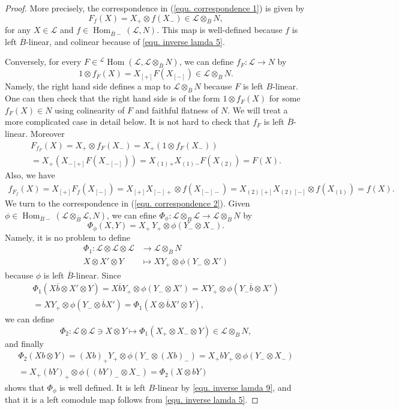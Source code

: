 \documentclass[a4paper,reqno]{amsart}
\DeclareMathOperator{\Hom}{Hom}
\numberwithin{equation}{section}
\theoremstyle{plain}
\theoremstyle{remark}
\numberwithin{equation}{section}
\newcommand{\ot}{\otimes}
\newcommand\ol{\overline}
\newcommand{\cL}{\mathcal{L}}
\newcommand{\BB}{\overline{B}}
\renewcommand{\o}{{}_{\scriptscriptstyle{(1)}}}
\renewcommand{\t}{{}_{\scriptscriptstyle{(2)}}}
\newcommand\ou[1]{\otimes_{#1}}
\newcommand{\CL}{\mathcal{L}}
\begin{document}
\begin{proof}
    More precisely, the correspondence in (\ref{equ. correspondence 1}) is given by
\[F_{f}(X)=X_{+}\ot f(X_{-})\in \cL\ot_{\BB}N,\]
for any $X\in \cL$ and $f\in \Hom_{\BB-}(\cL,N)$. This map is well-defined because $f$ is left $\BB$-linear, and colinear because of \eqref{equ. inverse lamda 5}.

Conversely, for every $F\in {}^{\cL}\Hom(\cL,\cL\ot_{\BB}N)$, we can define $f_F\colon \CL\to N$ by
\[1\ot f_{F}(X)=X_{[+]}F(X_{[-]})\in\CL\ou\BB N.\]
Namely, the right hand side defines a map to $\CL\ou\BB N$ because $F$ is left $B$-linear. One can then check that the right hand side is of the form $1\ot f_F(X)$ for some $f_F(X)\in N$ using colinearity of $F$ and faithful flatness of $N$. We will treat a more complicated case in detail below. It is not hard to check that $f_F$ is left $\ol B$-linear.
 Moreover
\begin{multline*}
    F_{f_F}(X)=X_+\ot f_F(X_-)
    =X_+(1\ot f_F(X_-))
    \\=X_+(X_{-[+]} F(X_{-[-]}))
    =X\o{}_{+}X\o{}_{-}F(X\t)=F(X).
\end{multline*}Also, we have
\begin{align*}
    f_{F_{f}}(X)=X_{[+]}F_{f}(X_{[-]})=X_{[+]}X_{[-]+}\ot f(X_{[-]-})=X\t{}_{[+]}X\t{}_{[-]}\ot f(X\o)=f(X).
\end{align*}
We turn to the correspondence in (\ref{equ. correspondence 2}).
Given $\phi\in \Hom_{\BB-}(\cL\ot_{\BB}\cL,N)$, we can efine $\Phi_\phi\colon \CL\ou B\CL\to \CL\ou\BB N$ by 
\[\Phi_{\phi}(X,Y)=X_{+}\,Y_{+}\ot \phi(Y_{-}\ot X_{-}).\]
Namely, it is no problem to define 
\begin{align*}\Phi_1\colon \CL\ot\CL\ot\CL&\to\CL\ou\BB N\\
X\ot X'\ot Y&\mapsto XY_+\ot\phi(Y_-\ot X')
\end{align*}
because $\phi$ is left $\BB$-linear. Since 
\begin{multline*}
\Phi_1(X\ol b\ot X'\ot Y)
=X\ol bY_+\ot\phi(Y_-\ot X')
=XY_+\ot \phi(Y_-\ol b\ot X')
\\=XY_+\ot\phi(Y_-\ot\ol bX')
=\Phi_1(X\ot\ol bX'\ot Y),
\end{multline*}
we can define 
\[\Phi_2\colon \CL\ot\CL\ni X\ot Y\mapsto \Phi_1(X_+\ot X_-\ot Y)\in\CL\ou BN,\]
and finally
\begin{multline*}
    \Phi_2(Xb\ot Y)=(Xb)_+Y_+\ot\phi(Y_-\ot  (Xb)_-)
    =X_+bY_+\ot\phi(Y_-\ot  X_-)
    \\=X_+(bY)_+\ot\phi((bY)_-\ot X_-)
    =\Phi_2(X\ot bY)
\end{multline*}
shows that $\Phi_\phi$ is well defined. It is left $B$-linear by \eqref{equ. inverse lamda 9}, and that it is a left comodule map follows from \eqref{equ. inverse lamda 5}.


\end{proof}
\end{document}
